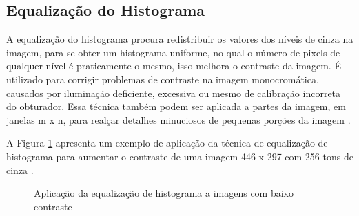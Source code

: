 \subsection{Equalização do Histograma}
\label{sub:equa-hist}

A equalização do histograma procura redistribuir os valores dos níveis de cinza na imagem, para se obter um histograma uniforme, no qual o número de pixels de qualquer nível é praticamente o mesmo, isso melhora o contraste da imagem.
É utilizado para corrigir problemas de contraste na imagem monocromática, causados por iluminação deficiente, excessiva ou mesmo de calibração incorreta do obturador. Essa técnica também podem ser aplicada a partes da imagem, em janelas m x n, para realçar detalhes minuciosos de pequenas porções da imagem \cite{pdi99}.

A Figura \ref{subfig:equl-histograma} apresenta um exemplo de aplicação da técnica de equalização de histograma
para aumentar o contraste de uma imagem 446 x 297 com 256 tons de cinza \cite{pdi99}.

\begin{figure}[h]
 \centering
   \qquad
     \qquad
    \qquad
   \caption{ Aplicação da equalização de histograma a imagens com baixo contraste \cite{pdi99}}
  \label{subfig:equl-histograma}
\end{figure}



